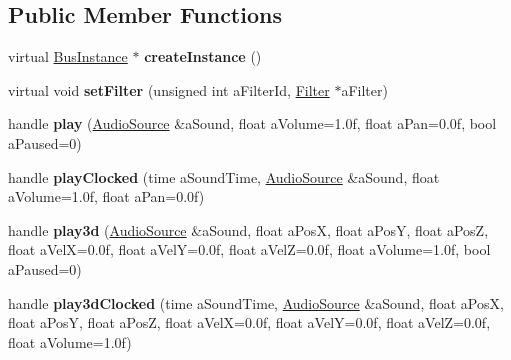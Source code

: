 \subsection*{Public Member Functions}
\begin{DoxyCompactItemize}
\item 
\mbox{\label{class_so_loud_1_1_bus_ac63113dc0ef268175d2c1d3bcf9939e1}} 
virtual \mbox{\hyperlink{class_so_loud_1_1_bus_instance}{Bus\+Instance}} $\ast$ {\bfseries create\+Instance} ()
\item 
\mbox{\label{class_so_loud_1_1_bus_ae632194b176342fa009ab184d38d8275}} 
virtual void {\bfseries set\+Filter} (unsigned int a\+Filter\+Id, \mbox{\hyperlink{class_so_loud_1_1_filter}{Filter}} $\ast$a\+Filter)
\item 
\mbox{\label{class_so_loud_1_1_bus_a9fed9a7b746fda44b9212471c9a2f4d4}} 
handle {\bfseries play} (\mbox{\hyperlink{class_so_loud_1_1_audio_source}{Audio\+Source}} \&a\+Sound, float a\+Volume=1.\+0f, float a\+Pan=0.\+0f, bool a\+Paused=0)
\item 
\mbox{\label{class_so_loud_1_1_bus_ad42e5cb151a2eececa8fb5e7d14a7669}} 
handle {\bfseries play\+Clocked} (time a\+Sound\+Time, \mbox{\hyperlink{class_so_loud_1_1_audio_source}{Audio\+Source}} \&a\+Sound, float a\+Volume=1.\+0f, float a\+Pan=0.\+0f)
\item 
\mbox{\label{class_so_loud_1_1_bus_a3469af79377fcf6d803351f81a3c9e58}} 
handle {\bfseries play3d} (\mbox{\hyperlink{class_so_loud_1_1_audio_source}{Audio\+Source}} \&a\+Sound, float a\+PosX, float a\+PosY, float a\+PosZ, float a\+VelX=0.\+0f, float a\+Vel\+Y=0.\+0f, float a\+Vel\+Z=0.\+0f, float a\+Volume=1.\+0f, bool a\+Paused=0)
\item 
\mbox{\label{class_so_loud_1_1_bus_ab660cf763eb4a68be97d7539d6893952}} 
handle {\bfseries play3d\+Clocked} (time a\+Sound\+Time, \mbox{\hyperlink{class_so_loud_1_1_audio_source}{Audio\+Source}} \&a\+Sound, float a\+PosX, float a\+PosY, float a\+PosZ, float a\+VelX=0.\+0f, float a\+Vel\+Y=0.\+0f, float a\+Vel\+Z=0.\+0f, float a\+Volume=1.\+0f)
\item 
\mbox{\label{class_so_loud_1_1_bus_a3981391bb38f3356fdb329124c398750}} 

\end{DoxyCompactItemize}
